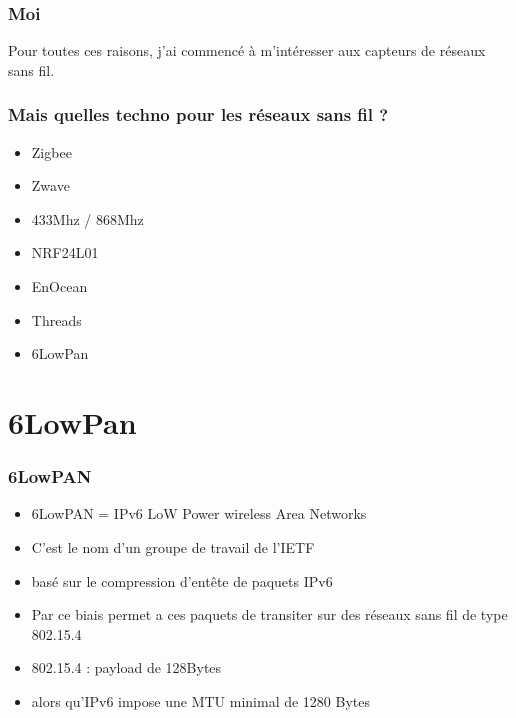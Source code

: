 \documentclass{smilebeamer}
\begin{document}
\begin{frame}
\frametitle{Moi}
\begin{center}
Pour toutes ces raisons, j'ai commencé à m'intéresser aux capteurs de réseaux sans fil.
\end{center}
\end{frame}

\begin{frame}
\frametitle{Mais quelles techno pour les réseaux sans fil ?}


\begin{itemize}
\item Zigbee
\item Zwave
\item 433Mhz / 868Mhz
\item NRF24L01
\item EnOcean
\item Threads
\item 6LowPan
\end{itemize}
\end{frame}

\section{6LowPan}

\begin{frame}
\frametitle{6LowPAN}
\begin{itemize}
\item 6LowPAN =  IPv6 LoW Power wireless Area Networks
\item C'est le nom d'un groupe de travail de l'IETF
\item basé sur le compression d'entête de paquets IPv6
\item Par ce biais permet a ces paquets de transiter sur des réseaux sans fil de type 802.15.4
\item 802.15.4 : payload de 128Bytes
\item alors qu'IPv6 impose une MTU minimal de 1280 Bytes
\end{itemize}
\end{frame}
\end{document}
